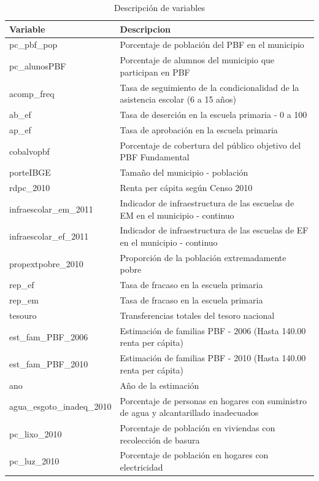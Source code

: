 \documentclass[
]{article}
\begin{document}
\begin{table}[!h]

\caption{\label{tab:unnamed-chunk-1}Descripción de variables}
\centering
\fontsize{8}{10}\selectfont
\begin{tabular}[t]{ll}
\toprule
Variable & Descripcion\\
\midrule
pc\_pbf\_pop & Porcentaje de población del PBF en el municipio\\
pc\_alunosPBF & Porcentaje de alumnos del municipio que participan en PBF\\
acomp\_freq & Tasa de seguimiento de la condicionalidad de la asistencia escolar (6 a 15 años)\\
ab\_ef & Tasa de deserción en la escuela primaria - 0 a 100\\
ap\_ef & Tasa de aprobación en la escuela primaria\\
\addlinespace
cobalvopbf & Porcentaje de cobertura del público objetivo del PBF Fundamental\\
porteIBGE & Tamaño del municipio - población\\
rdpc\_2010 & Renta per cápita según Censo 2010\\
infraescolar\_em\_2011 & Indicador de infraestructura de las escuelas de EM en el municipio - continuo\\
infraescolar\_ef\_2011 & Indicador de infraestructura de las escuelas de EF en el municipio - continuo\\
\addlinespace
propextpobre\_2010 & Proporción de la población extremadamente pobre\\
rep\_ef & Tasa de fracaso en la escuela primaria\\
rep\_em & Tasa de fracaso en la escuela primaria\\
tesouro & Transferencias totales del tesoro nacional\\
est\_fam\_PBF\_2006 & Estimación de familias PBF - 2006 (Hasta 140.00 renta per cápita)\\
\addlinespace
est\_fam\_PBF\_2010 & Estimación de familias PBF - 2010 (Hasta 140.00 renta per cápita)\\
ano & Año de la estimación\\
agua\_esgoto\_inadeq\_2010 & Porcentaje de personas en hogares con suministro de agua y alcantarillado inadecuados\\
pc\_lixo\_2010 & Porcentaje de población en viviendas con recolección de basura\\
pc\_luz\_2010 & Porcentaje de población en hogares con electricidad\\

\end{tabular}
\end{table}
\end{document}
